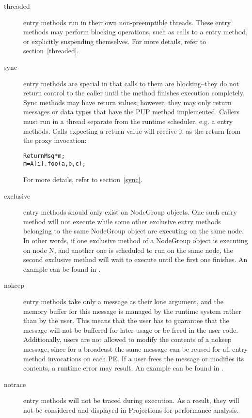 \begin{description}
\item[threaded] entry methods 
run in their own non-preemptible threads. These
entry methods may perform blocking operations, such as calls to a
 entry method, or explicitly suspending themselves. For more
details, refer to section~\ref{threaded}.

\item[sync] entry methods are special in that
calls to them are blocking--they do not return control to the caller until the
method finishes execution completely. Sync methods may have return values;
however, they may only return messages or data types that have the PUP method implemented. Callers must run in a thread separate
from the runtime scheduler, e.g. a  entry methods.  Calls
expecting a return value will receive it as the return from the proxy
invocation:
\begin{alltt}
 ReturnMsg* m;
 m = A[i].foo(a, b, c);
\end{alltt}
For more details, refer to section~\ref{sync}.

\item[exclusive]  entry methods should
only exist on NodeGroup objects. One such entry method will not execute while
some other exclusive entry methods belonging to the same NodeGroup object are
executing on the same node. In other words, if one exclusive method of a
NodeGroup object is executing on node N, and another one is scheduled to run on
the same node, the second exclusive method will wait to execute until the first
one finishes. An example can be found in .

\item[nokeep] entry methods take only a message as their lone argument,
and the memory buffer for this message is managed by the \charmpp{} runtime system
rather than by the user. This means that the user has to guarantee that
the message will not be buffered for later usage or be freed in the user
code. Additionally, users are not allowed to modify the contents of a nokeep
message, since for a broadcast the same message can be reused for all entry method
invocations on each PE. If a user frees the message or modifies its contents,
a runtime error may result. An example can be found in .

\item[notrace] entry methods will not be traced during execution. As a result, they will not be considered and displayed in Projections for
performance analysis.


\end{description}

